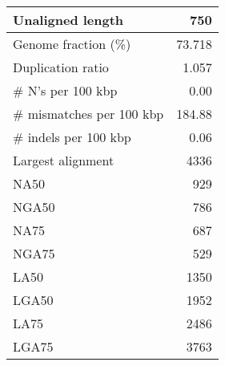 \documentclass[12pt,a4paper]{article}
\begin{document}
\begin{table}[ht]
\begin{center}
\begin{tabular}{|l*{1}{|r}|}
Unaligned length & 750 \\ \hline
Genome fraction (\%) & 73.718 \\ \hline
Duplication ratio & 1.057 \\ \hline
\# N's per 100 kbp & 0.00 \\ \hline
\# mismatches per 100 kbp & 184.88 \\ \hline
\# indels per 100 kbp & 0.06 \\ \hline
Largest alignment & 4336 \\ \hline
NA50 & 929 \\ \hline
NGA50 & 786 \\ \hline
NA75 & 687 \\ \hline
NGA75 & 529 \\ \hline
LA50 & 1350 \\ \hline
LGA50 & 1952 \\ \hline
LA75 & 2486 \\ \hline
LGA75 & 3763 \\ \hline
\end{tabular}
\end{center}
\end{table}
\end{document}
